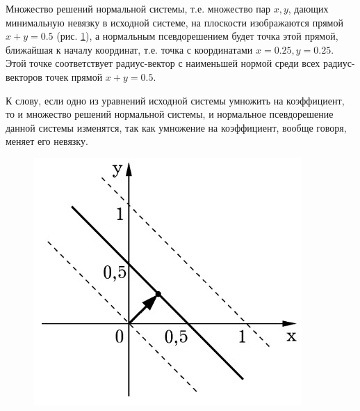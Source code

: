 \begin{example}
    Множество решений нормальной системы, т.е. множество пар $x, y$, дающих минимальную невязку в исходной системе, на плоскости изображаются прямой $x + y = 0.5$ (рис. \ref{fig:picture_16_1}), а нормальным псевдорешением будет точка этой прямой, ближайшая к началу координат, т.е. точка с координатами $x = 0.25, y = 0.25$. Этой точке соответствует радиус-вектор с наименьшей нормой среди всех радиус-векторов точек прямой $x + y = 0.5$.
    
    К слову, если одно из уравнений исходной системы умножить на коэффициент, то и множество решений нормальной системы, и нормальное псевдорешение данной системы изменятся, так как умножение на коэффициент, вообще говоря, меняет его невязку.

    \begin{figure}[H]
        \centering
        \includegraphics[scale=0.6]{images/16_1.jpg}
        \caption{}
        \label{fig:picture_16_1}
    \end{figure}

\end{example}
